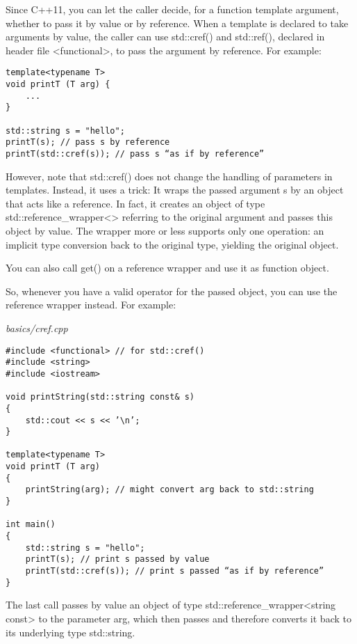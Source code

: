 Since C++11, you can let the caller decide, for a function template argument, whether to pass it by value or by reference. When a template is declared to take arguments by value, the caller can use std::cref() and std::ref(), declared in header file <functional>, to pass the argument by reference. For example:

\begin{lstlisting}[style=styleCXX]
template<typename T>
void printT (T arg) {
	...
}

std::string s = "hello";
printT(s); // pass s by reference
printT(std::cref(s)); // pass s “as if by reference”
\end{lstlisting}

However, note that std::cref() does not change the handling of parameters in templates. Instead, it uses a trick: It wraps the passed argument s by an object that acts like a reference. In fact, it creates an object of type std::reference\_wrapper<> referring to the original argument and passes this object by value. The wrapper more or less supports only one operation: an implicit type conversion back to the original type, yielding the original object.

\begin{tcolorbox}[colback=webgreen!5!white,colframe=webgreen!75!black]
\hspace*{0.75cm}You can also call get() on a reference wrapper and use it as function object.
\end{tcolorbox}

So, whenever you have a valid operator for the passed object, you can use the reference wrapper instead. For example:

\noindent
\textit{basics/cref.cpp}
\begin{lstlisting}[style=styleCXX]
#include <functional> // for std::cref()
#include <string>
#include <iostream>

void printString(std::string const& s)
{
	std::cout << s << ’\n’;
}

template<typename T>
void printT (T arg)
{
	printString(arg); // might convert arg back to std::string
}

int main()
{
	std::string s = "hello";
	printT(s); // print s passed by value
	printT(std::cref(s)); // print s passed “as if by reference”
}
\end{lstlisting}

The last call passes by value an object of type std::reference\_wrapper<string const> to the parameter arg, which then passes and therefore converts it back to its underlying type std::string.

